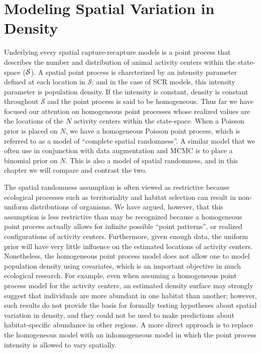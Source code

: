 \chapter{
Modeling Spatial Variation in Density
}
\label{chapt.state-space}

\vspace{0.3cm}

Underlying every spatial capture-recapture models is a point process
that describes the number and distribution of animal activity
centers within the state-space ($\cal{S}$).
A spatial point process is charcterized by %
an intensity parameter defined at each location in $\mathcal{S}$; and
in the case of SCR models, this intensity parameter is population
density. If the intensity is constant, density is constant throughout
$\mathcal{S}$ and the point process is said to be homogeneous.
Thus far we have focused our attention on homogeneous %
point processes whose realized values are the locations of the $N$
activity centers within the state-space. When a Poisson prior is
placed on $N$, we have a homogeneous Poisson point process, which
is referred to as a model of ``complete spatial randomness''.
A similar
model that we often use in conjunction with data augmentation and MCMC
is to place a binomial prior on $N$. This is also a model of spatial
randomness, and in this chapter we will compare and contrast the two.

The spatial randomness assumption is often viewed as restrictive
because ecological processes such as
territoriality and habitat selection can result in non-uniform
distributions of organisms. We have argued, however, that this
assumption is less restrictive than may be recognized because a
homogeneous point process actually allows for infinite
possible ``point patterns'', or realized configurations of activity
centers. Furthermore, given enough data,
the uniform prior will have very little influence on the estimated
locations of activity centers. Nonetheless, the homogeneous point
process model does not allow one to model population density using
covariates, which is an important objective in much ecological research.
For example, even when assuming a homogeneous point process model for
the activity centers, an estimated density surface may strongly
suggest that individuals are more abundant in one habitat than
another; however, such results do not provide the basis for formally testing
hypotheses about spatial variation in density, and they could not be
used to make predictions about habitat-specific abundance in other
regions. A more direct approach is to replace the homogeneous model
with an inhomogeneous model in which the point process intensity
is allowed to vary spatially.

